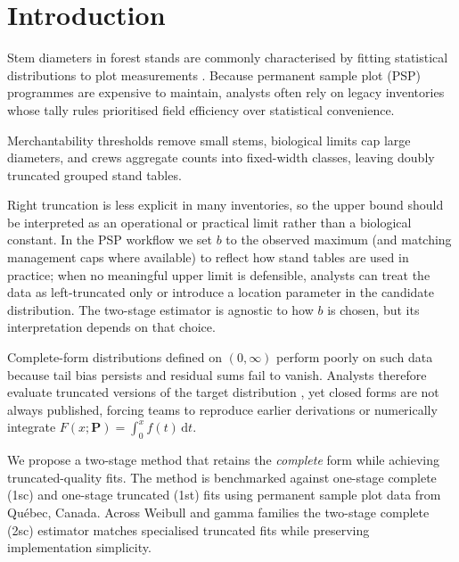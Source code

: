 \section{Introduction}
\label{sec:introduction}

Stem diameters in forest stands are commonly characterised by fitting statistical distributions to plot measurements \citep{bailey1973quantifying, hyink1983generalized, gunn2000modeling, orellana2017fitting, orellana2017parameter}. Because permanent sample plot (PSP) programmes are expensive to maintain, analysts often rely on legacy inventories whose tally rules prioritised field efficiency over statistical convenience.

Merchantability thresholds remove small stems, biological limits cap large diameters, and crews aggregate counts into fixed-width classes, leaving doubly truncated grouped stand tables.

Right truncation is less explicit in many inventories, so the upper bound should be interpreted as an operational or practical limit rather than a biological constant. In the PSP workflow we set $b$ to the observed maximum (and matching management caps where available) to reflect how stand tables are used in practice; when no meaningful upper limit is defensible, analysts can treat the data as left-truncated only or introduce a location parameter in the candidate distribution. The two-stage estimator is agnostic to how $b$ is chosen, but its interpretation depends on that choice.

Complete-form distributions defined on $(0, \infty)$ perform poorly on such data because tail bias persists and residual sums fail to vanish. Analysts therefore evaluate truncated versions of the target distribution \citep{zutter1986characterizing}, yet closed forms are not always published, forcing teams to reproduce earlier derivations \citep{mittal1989estimating, hannon1999estimation, hegde1989estimation, ahmad2001moments, wingo1989left} or numerically integrate $F(x; \boldsymbol{P}) = \int_0^x f(t)\,\mathrm{d}t$.

We propose a two-stage method that retains the \emph{complete} form while achieving truncated-quality fits. The method is benchmarked against one-stage complete (1sc) and one-stage truncated (1st) fits using permanent sample plot data from Qu\'ebec, Canada. Across Weibull and gamma families the two-stage complete (2sc) estimator matches specialised truncated fits while preserving implementation simplicity.
